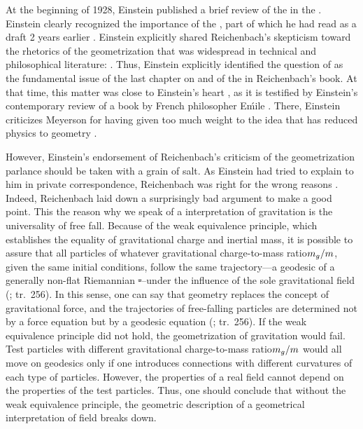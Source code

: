 \documentclass[submitted]{article}
\newcommand{\ctmr}{charge-to-mass ratio\xspace}
\newcommand{\ctmrg}{\ensuremath{\hfrac{m_g}{m}}\xspace}
\renewcommand{\me}{;~m.e.{}}
\newcommand{\PRZL}{\citetitle{Reichenbach1928}\xspace}
\renewcommand{\rzlp}[2]{(\cite[#1]{Reichenbach1928}; tr.\ #2)\xspace}
\begin{document}
At the beginning of 1928, Einstein published a brief review of the \PRZL \citep{Einstein1928d} in the . Einstein clearly recognized the importance of the \Ap, part of which he had read as a draft 2 years earlier . Einstein explicitly shared Reichenbach's skepticism toward the rhetorics of the geometrization that was widespread in technical and philosophical literature:  \citep[][20\me]{Einstein1928d}. Thus, Einstein explicitly identified the question of  as the fundamental issue of the last chapter on \gr and of the \Ap in Reichenbach's book. At that time, this matter was close to Einstein's heart \citep{Lehmkuhl2014}, as it is testified by Einstein's contemporary review \citep{Einstein1928} of a book by French philosopher E\'mile \citet{Meyerson1925}. There, Einstein criticizes Meyerson for having given too much weight to the idea that \gr has reduced physics to geometry .

However, Einstein's endorsement of Reichenbach's criticism of the geometrization parlance should be taken with a grain of salt. As Einstein had tried to explain to him in private correspondence, Reichenbach was right for the wrong reasons . Indeed, Reichenbach laid down a surprisingly bad argument to make a good point. This the reason why we speak of a  interpretation of gravitation is the universality of free fall. Because of the weak equivalence principle, which establishes the equality of gravitational charge and inertial mass, it is possible to assure that all particles of whatever gravitational \ctmr \ctmrg, given the same initial conditions, follow the same trajectory---a geodesic of a generally non-flat Riemannian \st---under the influence of the sole gravitational field \rzlp{293}{256}. In this sense, one can say that geometry replaces the concept of gravitational force, and the trajectories of free-falling particles are determined not by a force equation but by a geodesic equation \rzlp{293}{256}. If the weak equivalence principle did not hold, the geometrization of gravitation would fail. Test particles with different gravitational \ctmr \ctmrg would all move on geodesics only if one introduces connections with different curvatures of each type of particles. However, the properties of a real field cannot depend on the properties of the test particles. Thus, one should conclude that without the weak equivalence principle, the geometric description of a geometrical interpretation of field breaks down. 
\end{document}
